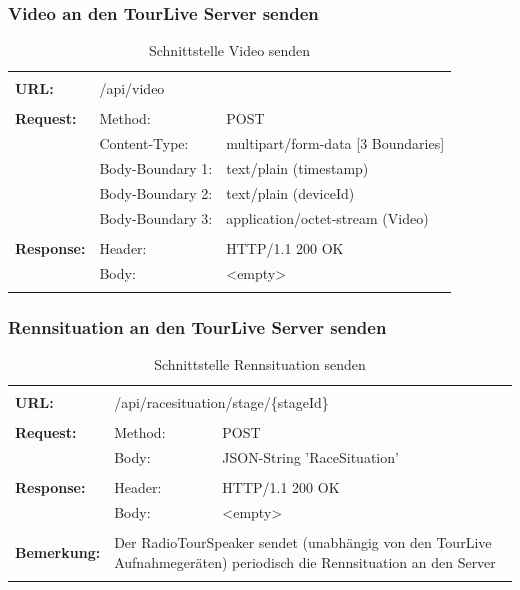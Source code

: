 \subsubsection{Video an den TourLive Server senden}
\begin{longtable}{ p{2.5cm} || p{3.5cm} p{5.5cm}}
&  \\ [-1.5ex]
	\textbf{URL:} & \multicolumn{2}{p{9cm}}{/api/video}  \\ [1ex] \hline & &  \\ [-1.5ex]
	\textbf{Request:} & Method: & POST \\
		& Content-Type: & multipart/form-data [3 Boundaries] \\
		& Body-Boundary 1: & text/plain (timestamp) \\
		& Body-Boundary 2: & text/plain (deviceId) \\
		& Body-Boundary 3: & application/octet-stream (Video)  \\ [1ex] \hline & &  \\ [-1.5ex]
	\textbf{Response:} & Header: & HTTP/1.1 200 OK \\
		& Body: & <empty>  \\ [1ex]
	\caption{Schnittstelle Video senden} 
\end{longtable}

\newpage
\subsubsection{Rennsituation an den TourLive Server senden}
\begin{longtable}{ p{2.5cm} || p{3.5cm} p{5.5cm}}
&  \\ [-1.5ex]
	\textbf{URL:} & \multicolumn{2}{p{9cm}}{/api/racesituation/stage/\{stageId\}}  \\ [1ex] \hline & &  \\ [-1.5ex]
	\textbf{Request:} & Method: & POST \\
		& Body: & JSON-String 'RaceSituation' \\ [1ex] \hline & &  \\ [-1.5ex]
	\textbf{Response:} & Header: & HTTP/1.1 200 OK \\
		& Body: & <empty>  \\ [1ex] \hline & &  \\ [-1.5ex]	
	\textbf{Bemerkung:} & \multicolumn{2}{p{9cm}}{Der RadioTourSpeaker sendet (unabhängig von den TourLive Aufnahmegeräten) periodisch die Rennsituation an den Server} \\ [1ex] 
	\caption{Schnittstelle Rennsituation senden}
\end{longtable}

